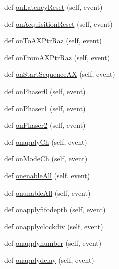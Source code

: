 \begin{DoxyCompactItemize}
\item 
def \hyperlink{classProtoFEB__v1_1_1ProtoFEB__v1_a243c7ced24005de9ce61efac1db46564}{on\+Latency\+Reset} (self, event)
\item 
def \hyperlink{classProtoFEB__v1_1_1ProtoFEB__v1_a11a6f30c362bd2261ab1ea60a04b36f4}{on\+Acquisition\+Reset} (self, event)
\item 
def \hyperlink{classProtoFEB__v1_1_1ProtoFEB__v1_ae58fe734ecb48ef9b4baa8583598c17f}{on\+To\+A\+X\+Ptr\+Raz} (self, event)
\item 
def \hyperlink{classProtoFEB__v1_1_1ProtoFEB__v1_a737330f2c73fda78aed98f9ce652ec45}{on\+From\+A\+X\+Ptr\+Raz} (self, event)
\item 
def \hyperlink{classProtoFEB__v1_1_1ProtoFEB__v1_a5ab10f7dde24277b9c9680aaf4cd804b}{on\+Start\+Sequence\+AX} (self, event)
\item 
def \hyperlink{classProtoFEB__v1_1_1ProtoFEB__v1_a06d63189000c361c5ebaf7258bce3af2}{on\+Phaser0} (self, event)
\item 
def \hyperlink{classProtoFEB__v1_1_1ProtoFEB__v1_a7ca754417fbe0aefab173753713c02d3}{on\+Phaser1} (self, event)
\item 
def \hyperlink{classProtoFEB__v1_1_1ProtoFEB__v1_a4680b8cb99ce517798f9c0bb7b4c4d0d}{on\+Phaser2} (self, event)
\item 
def \hyperlink{classProtoFEB__v1_1_1ProtoFEB__v1_a1dcbf839bbd6f33c1b9de47749d98626}{onapply\+Ch} (self, event)
\item 
def \hyperlink{classProtoFEB__v1_1_1ProtoFEB__v1_aa3700cfa620c058e18e6da7ca2e270c1}{on\+Mode\+Ch} (self, event)
\item 
def \hyperlink{classProtoFEB__v1_1_1ProtoFEB__v1_ad7f0700c99d68f8d6fb83d413f22f6ca}{onenable\+All} (self, event)
\item 
def \hyperlink{classProtoFEB__v1_1_1ProtoFEB__v1_a694594dcf119e0a6055a54dc108f14e6}{onunable\+All} (self, event)
\item 
def \hyperlink{classProtoFEB__v1_1_1ProtoFEB__v1_affa41d5c50897be4f575bca04c73fd2b}{onapplyfifodepth} (self, event)
\item 
def \hyperlink{classProtoFEB__v1_1_1ProtoFEB__v1_aa0834fab61762024dcc8c89ba06bd29b}{onapplyclockdiv} (self, event)
\item 
def \hyperlink{classProtoFEB__v1_1_1ProtoFEB__v1_aadcdf53a503962a44439327ee7819de7}{onapplynumber} (self, event)
\item 
def \hyperlink{classProtoFEB__v1_1_1ProtoFEB__v1_a2d83c6aa70f086f76cd03957971c35a9}{onapplydelay} (self, event)
\item 

\end{DoxyCompactItemize}
